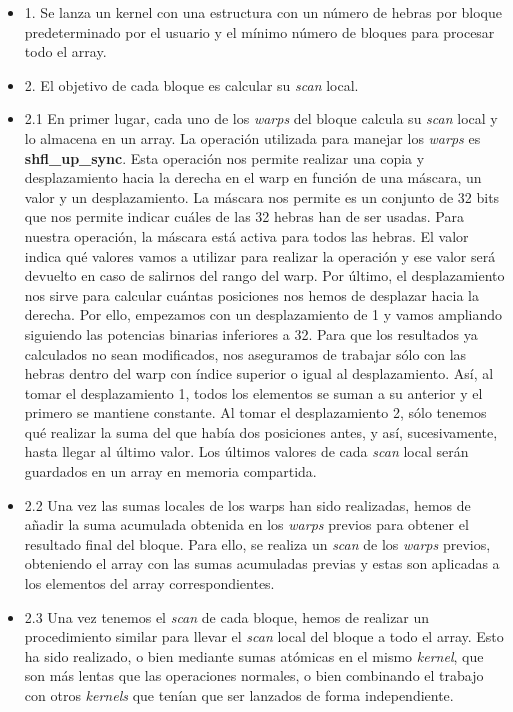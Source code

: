 \begin{itemize}
    \item 1. Se lanza un kernel con una estructura con un número de hebras por bloque predeterminado por el usuario y el mínimo número de bloques para procesar todo el array.
    \item 2. El objetivo de cada bloque es calcular su \textit{scan} local.
    \item 2.1 En primer lugar, cada uno de los \textit{warps} del bloque calcula su \textit{scan} local y lo almacena en un array. La operación utilizada para manejar los \textit{warps} es \textbf{shfl\_up\_sync}. Esta operación nos permite realizar una copia y desplazamiento hacia la derecha en el warp en función de una máscara, un valor y un desplazamiento. La máscara nos permite es un conjunto de 32 bits que nos permite indicar cuáles de las 32 hebras han de ser usadas. Para nuestra operación, la máscara está activa para todos las hebras. El valor indica qué valores vamos a utilizar para realizar la operación y ese valor será devuelto en caso de salirnos del rango del warp. Por último, el desplazamiento nos sirve para calcular cuántas posiciones nos hemos de desplazar hacia la derecha. Por ello, empezamos con un desplazamiento de 1 y vamos ampliando siguiendo las potencias binarias inferiores a 32. Para que los resultados ya calculados no sean modificados, nos aseguramos de trabajar sólo con las hebras dentro del warp con índice superior o igual al desplazamiento. Así, al tomar el desplazamiento 1, todos los elementos se suman a su anterior y el primero se mantiene constante. Al tomar el desplazamiento 2, sólo tenemos qué realizar la suma del que había dos posiciones antes, y así, sucesivamente, hasta llegar al último valor. Los últimos valores de cada \textit{scan} local serán guardados en un array en memoria compartida.

    \item 2.2 Una vez las sumas locales de los warps han sido realizadas, hemos de añadir la suma acumulada obtenida en los \textit{warps} previos para obtener el resultado final del bloque. Para ello, se realiza un \textit{scan} de los \textit{warps} previos, obteniendo el array con las sumas acumuladas previas y estas son aplicadas a los elementos del array correspondientes.

    \item 2.3 Una vez tenemos el \textit{scan} de cada bloque, hemos de realizar un procedimiento similar para llevar el \textit{scan} local del bloque a todo el array. Esto ha sido realizado, o bien mediante sumas atómicas en el mismo \textit{kernel}, que son más lentas que las operaciones normales, o bien combinando el trabajo con otros \textit{kernels} que tenían que ser lanzados de forma independiente.

\end{itemize}



